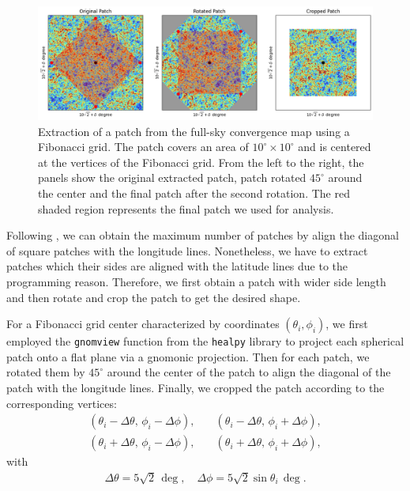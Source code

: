 \begin{figure}
    \centering
    \includegraphics[width=\textwidth]{figures/fibonacci_extraction.png}
    \caption{Extraction of a patch from the full-sky convergence map using a Fibonacci grid. The patch covers an area of $10^\circ \times 10^\circ$ and is centered at the vertices of the Fibonacci grid. From the left to the right, the panels show the original extracted patch, patch rotated $45^\circ$ around the center and the final patch after the second rotation. The red shaded region represents the final patch we used for analysis.
    } \label{fig:fibonacci_extraction}
\end{figure}

Following \citet{2023MNRAS.524.5591F}, we can obtain the maximum number of patches by align the diagonal of square patches with the longitude lines. Nonetheless, we have to extract patches which their sides are aligned with the latitude lines due to the programming reason. Therefore, we first obtain a patch with wider side length and then rotate and crop the patch to get the desired shape.

For a Fibonacci grid center characterized by coordinates \( (\theta_i, \phi_i) \), we first employed the \texttt{gnomview} function from the \texttt{healpy} library \citep{Zonca2019} to project each spherical patch onto a flat plane via a gnomonic projection. Then for each patch, we rotated them by $45^\circ$ around the center of the patch to align the diagonal of the patch with the longitude lines. Finally, we cropped the patch according to the corresponding vertices:
\begin{align}
    \left( \theta_i - \Delta \theta,\, \phi_i - \Delta \phi \right), \quad &\left( \theta_i - \Delta \theta,\, \phi_i + \Delta \phi \right), \nonumber \\
    \left( \theta_i + \Delta \theta,\, \phi_i - \Delta \phi \right), \quad &\left( \theta_i + \Delta \theta,\, \phi_i + \Delta \phi \right),
\end{align}
with
\begin{align}
    \Delta \theta = 5\sqrt{2}\, \mathrm{\deg}, \quad \Delta \phi = 5\sqrt{2}\sin \theta_i \, \mathrm{\deg}.
\end{align}

